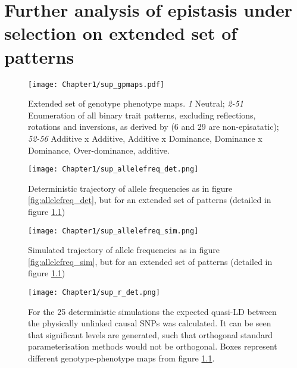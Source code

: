 



\chapter{Further analysis of epistasis under selection on extended set of patterns}
\label{AppendixA}

\begin{figure}
\begin{center}
\texttt{[image: Chapter1/sup\_gpmaps.pdf]}
\caption[Extended set of genotype-phenotype maps]{Extended set of genotype phenotype maps. \emph{1} Neutral; \emph{2-51} Enumeration of all binary trait patterns, excluding reflections, rotations and inversions, as derived by \citet{Li2000} (6 and 29 are non-episatatic); \emph{52-56} Additive x Additive, Additive x Dominance, Dominance x Dominance, Over-dominance, additive.}
\label{fig:sup_gpmaps}
\end{center}
\end{figure}

\begin{figure}
\begin{center}
\texttt{[image: Chapter1/sup\_allelefreq\_det.png]}
\caption[Deterministic trajectory of allele frequencies for extended maps]{Deterministic trajectory of allele frequencies as in figure \ref{fig:allelefreq_det}, but for an extended set of patterns (detailed in figure \ref{fig:sup_gpmaps})}
\label{fig:sup_allelefreq_det}
\end{center}
\end{figure}

\begin{figure}
\begin{center}
\texttt{[image: Chapter1/sup\_allelefreq\_sim.png]}
\caption[Simulated trajectory of allele frequencies for extended maps for extended maps]{Simulated trajectory of allele frequencies as in figure \ref{fig:allelefreq_sim}, but for an extended set of patterns (detailed in figure \ref{fig:sup_gpmaps})}
\label{fig:sup_allelefreq_sim}
\end{center}
\end{figure}

\begin{figure}
\begin{center}
\texttt{[image: Chapter1/sup\_r\_det.png]}
\caption[Deterministic calculations of quasi-LD for extended maps]{For the 25 deterministic simulations the expected quasi-LD between the physically unlinked causal SNPs was calculated. It can be seen that significant levels are generated, such that orthogonal standard parameterisation methods would not be orthogonal. Boxes represent different genotype-phenotype maps from figure \ref{fig:sup_gpmaps}.}
\label{fig:sup_r_det}
\end{center}
\end{figure}

